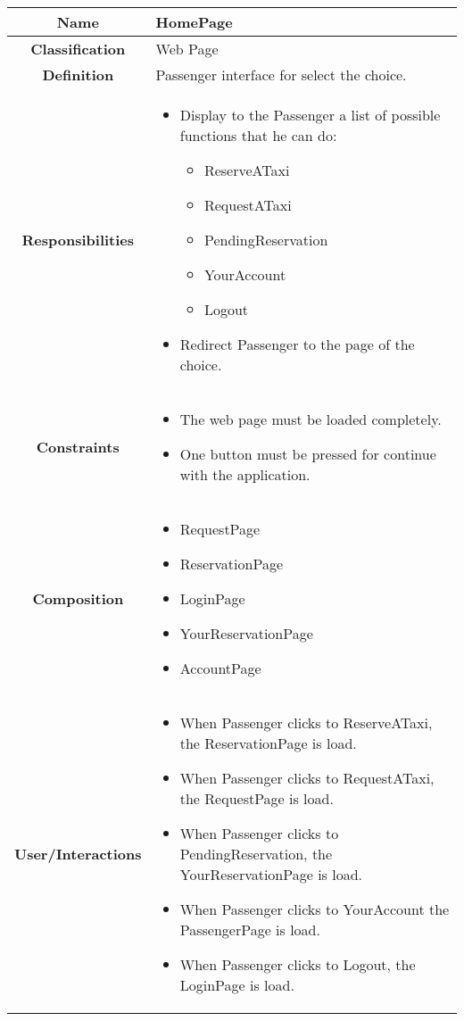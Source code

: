 \documentclass[11pt, a4paper,titlepage]{article}
\begin{document}
\begin{enumerate}
\begin{tabularx}{\textwidth}{| c | X |}
	\hline
	\textbf{Name} & 
	HomePage
	\\
	\hline
	\textbf{Classification} & 
	Web Page
	\\
	\hline
	\textbf{Definition} & 
	Passenger interface for select the choice.
	\\
	\hline
	\textbf{Responsibilities} &
	\begin{itemize}
		\item 
		Display to the Passenger a list of possible functions that he can do:
		\begin{itemize}
			\item ReserveATaxi
			\item RequestATaxi
			\item PendingReservation
			\item YourAccount
			\item Logout    
		\end{itemize}
		\item  Redirect Passenger to the page of the choice.
	\end{itemize}
	\\
	\hline
	\textbf{Constraints} & 
	\begin{itemize}
		\item  The web page must be loaded completely.
		\item One button must be pressed for continue with the application.
	\end{itemize}
	\\
	\hline
	\textbf{Composition} & 
		\begin{itemize}
			\item RequestPage
			\item ReservationPage    
			\item LoginPage
			\item YourReservationPage    
			\item AccountPage
		\end{itemize}
	\\
	\hline
	\textbf{User/Interactions} & 
		\begin{itemize}
			\item When Passenger clicks to ReserveATaxi, the ReservationPage is load.            
			\item When Passenger clicks to RequestATaxi, the RequestPage is load.        
			\item When Passenger clicks to PendingReservation, the YourReservationPage is load.        
			\item When Passenger clicks to YourAccount the PassengerPage is load.    
			\item When Passenger clicks to Logout, the LoginPage is load.
		\end{itemize}	
	\\
	\hline	
\end{tabularx}


\end{enumerate}
\end{document}
